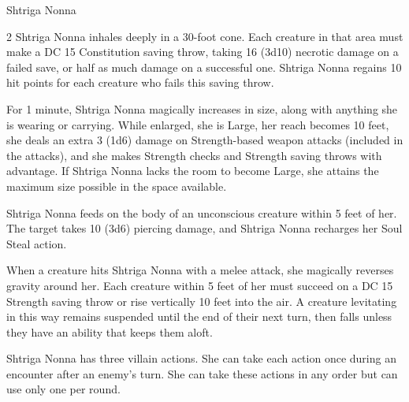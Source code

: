 \documentclass[10pt,a4paper,twoside,bg=print,twocolumn,openany,nodeprecatedcode]{dndbook}
\begin{document}
\begin{DndMonster}[float*=b,width=\textwidth + 8pt]{Shtriga Nonna}
\begin{multicols}{2}
Shtriga Nonna inhales deeply in a 30-foot cone. Each creature in that area must make a DC 15 Constitution saving throw, taking 16 (3d10) necrotic damage on a failed save, or half as much damage on a successful one. Shtriga Nonna regains 10 hit points for each creature who fails this saving throw.

For 1 minute, Shtriga Nonna magically increases in size, along with anything she is wearing or carrying. While enlarged, she is Large, her reach becomes 10 feet, she deals an extra 3 (1d6) damage on Strength-based weapon attacks (included in the attacks), and she makes Strength checks and Strength saving throws with advantage. If Shtriga Nonna lacks the room to become Large, she attains the maximum size possible in the space available.

Shtriga Nonna feeds on the body of an unconscious creature within 5 feet of her. The target takes 10 (3d6) piercing damage, and Shtriga Nonna recharges her Soul Steal action.

When a creature hits Shtriga Nonna with a melee attack, she magically reverses gravity around her. Each creature within 5 feet of her must succeed on a DC 15 Strength saving throw or rise vertically 10 feet into the air. A creature levitating in this way remains suspended until the end of their next turn, then falls unless they have an ability that keeps them aloft.

Shtriga Nonna has three villain actions. She can take each action once during an encounter after an enemy's turn. She can take these actions in any order but can use only one per round.


\end{multicols}
\end{DndMonster}
\end{document}
